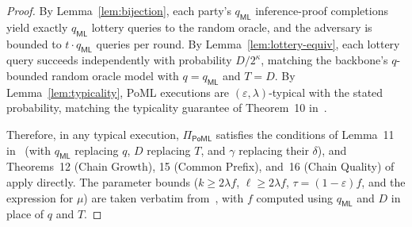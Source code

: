 \begin{proof}
By Lemma~\ref{lem:bijection}, each party's $q_{\mathsf{ML}}$ inference-proof completions yield exactly $q_{\mathsf{ML}}$ lottery queries to the random oracle, and the adversary is bounded to $t \cdot q_{\mathsf{ML}}$ queries per round. By Lemma~\ref{lem:lottery-equiv}, each lottery query succeeds independently with probability $D/2^\kappa$, matching the backbone's $q$-bounded random oracle model with $q = q_{\mathsf{ML}}$ and $T = D$. By Lemma~\ref{lem:typicality}, PoML executions are $(\varepsilon, \lambda)$-typical with the stated probability, matching the typicality guarantee of Theorem~10 in~\cite{GKL20}.

Therefore, in any typical execution, $\Pi_{\mathsf{PoML}}$ satisfies the conditions of Lemma~11 in~\cite{GKL20} (with $q_{\mathsf{ML}}$ replacing $q$, $D$ replacing $T$, and $\gamma$ replacing their $\delta$), and Theorems~12 (Chain Growth), 15 (Common Prefix), and~16 (Chain Quality) of~\cite{GKL20} apply directly. The parameter bounds ($k \geq 2\lambda f$, $\ell \geq 2\lambda f$, $\tau = (1 - \varepsilon)f$, and the expression for $\mu$) are taken verbatim from~\cite{GKL20}, with $f$ computed using $q_{\mathsf{ML}}$ and $D$ in place of $q$ and $T$.
\end{proof}






